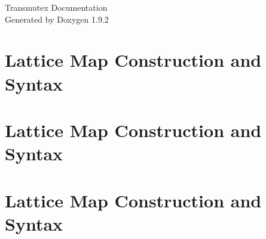 \documentclass[twoside]{book}
\newcommand{\+}{\discretionary{\mbox{\scriptsize$\hookleftarrow$}}{}{}}
\newcommand{\clearemptydoublepage}{%
    \newpage{\pagestyle{empty}\cleardoublepage}%
  }
\begin{document}
  \raggedbottom
    \hypersetup{pageanchor=false,
                bookmarksnumbered=true,
                pdfencoding=unicode
               }
  \begin{titlepage}
  \vspace*{7cm}
  \begin{center}%
  {\Large Transmutex Documentation}\\
  \vspace*{1cm}
  {\large Generated by Doxygen 1.9.2}\\
  \end{center}
  \end{titlepage}
  \clearemptydoublepage
  \tableofcontents
  \clearemptydoublepage
  \hypersetup{pageanchor=true}
\chapter{Lattice Map Construction and Syntax}
\label{md___users__transmutex__simulation__a_d_s__simulation_code__benchmark_1_src_lattice_map__r_e_a_d_m_e}

\chapter{Lattice Map Construction and Syntax}
\label{md___users__transmutex__simulation__a_d_s__simulation_code__benchmark_2_src_lattice_map__r_e_a_d_m_e}

\chapter{Lattice Map Construction and Syntax}
\label{md___users__transmutex__simulation__a_d_s__simulation_code__benchmark_3_src_lattice_map__r_e_a_d_m_e}

\end{document}
